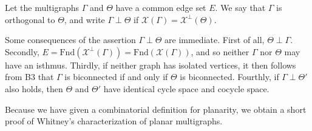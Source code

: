 Let the multigraphs $\Gamma$ and $\Theta$ have a common edge set $E$. We say that $\Gamma$ is orthogonal to $\Theta$, and write $\Gamma \perp \Theta$ if $\mathcal{X}(\Gamma) = \mathcal{X}^{\perp}(\Theta)$.

Some consequences of the assertion $\Gamma \perp \Theta$ are immediate. First of all, $\Theta \perp \Gamma$. Secondly, $E = \text{Fnd}(\mathcal{X}^{\perp}(\Gamma)) = \text{Fnd}(\mathcal{X}(\Gamma))$, and so neither $\Gamma$ nor $\Theta$ may have an isthmus. Thirdly, if neither graph has isolated vertices, it then follows from B3 that $\Gamma$ is biconnected if and only if $\Theta$ is biconnected. Fourthly, if $\Gamma \perp \Theta'$ also holds, then $\Theta$ and $\Theta'$ have identical cycle space and cocycle space.

Because we have given a combinatorial definition for planarity, we obtain a short proof of Whitney’s characterization of planar multigraphs.
